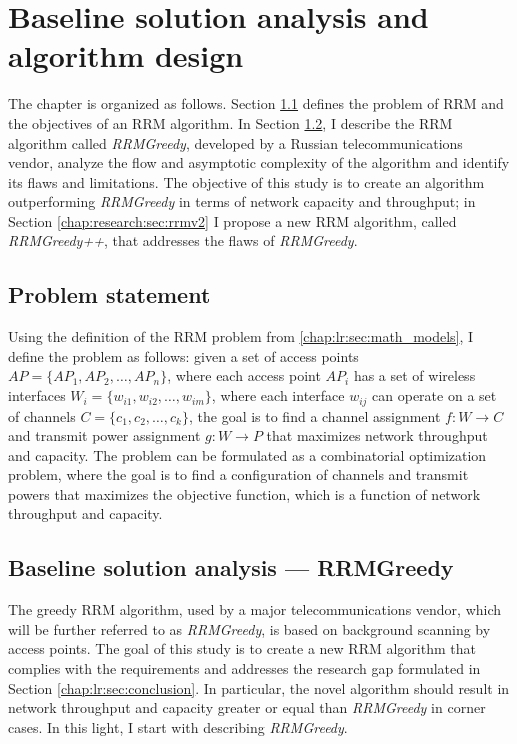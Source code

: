 \newcommand{\rrmG}{$\boldsymbol{G}$}

\chapter{Baseline solution analysis and algorithm design}
\label{chap:research}

The chapter is organized as follows. Section \ref{chap:research:sec:problem_statement} defines the problem of RRM and the objectives of an RRM algorithm.
In Section \ref{sec:baseline}, I describe the RRM algorithm called \textit{RRMGreedy}, developed by a Russian telecommunications vendor, analyze the flow and asymptotic complexity of the algorithm and identify its flaws and limitations. The objective of this study is to create an algorithm outperforming \textit{RRMGreedy} in terms of network capacity and throughput; in Section \ref{chap:research:sec:rrmv2} I propose a new RRM algorithm, called \textit{RRMGreedy++}, that addresses the flaws of \textit{RRMGreedy}.


\section{Problem statement}
\label{chap:research:sec:problem_statement}
Using the definition of the RRM problem from \ref{chap:lr:sec:math_models}, I define the problem as follows: given a set of access points $AP = \{AP_1, AP_2, \ldots, AP_n\}$, where each access point $AP_i$ has a set of wireless interfaces $W_i = \{w_{i1}, w_{i2}, \ldots, w_{im}\}$, where each interface $w_{ij}$ can operate on a set of channels $C = \{c_1, c_2, \ldots, c_k\}$, the goal is to find a channel assignment $f: W \to C$ and transmit power assignment $g: W \to P$ that maximizes network throughput and capacity. The problem can be formulated as a combinatorial optimization problem, where the goal is to find a configuration of channels and transmit powers that maximizes the objective function, which is a function of network throughput and capacity.

\section{Baseline solution analysis --- RRMGreedy}
\label{sec:baseline}
The greedy RRM algorithm, used by a major telecommunications vendor, which will be further referred to as \textit{RRMGreedy}, is based on background scanning by access points. The goal of this study is to create a new RRM algorithm that complies with the requirements and addresses the research gap formulated in Section \ref{chap:lr:sec:conclusion}.
In particular, the novel algorithm should result in network throughput and capacity greater or equal than \textit{RRMGreedy} in corner cases. In this light, I start with describing \textit{RRMGreedy}.

